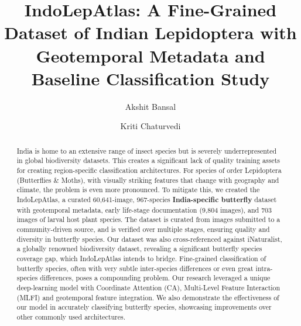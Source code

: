 \documentclass[runningheads]{llncs}
\begin{document}
%
\title{IndoLepAtlas: A Fine-Grained Dataset of Indian Lepidoptera with Geotemporal Metadata and Baseline Classification Study}
%
%
%
\author{
Akshit Bansal \and
Kriti Chaturvedi
}
%
%
\maketitle

\begin{abstract}
India is home to an extensive range of insect species but is severely underrepresented in global biodiversity datasets. This creates a significant lack of quality training assets for creating region-specific classification architectures. For species of order Lepidoptera (Butterflies \& Moths), with visually striking features that change with geography and climate, the problem is even more pronounced. To mitigate this, we created the IndoLepAtlas, a curated 60,641-image, 967-species \textbf{India-specific butterfly} dataset with geotemporal metadata, early life-stage documentation (9,804 images), and 703 images of larval host plant species. The dataset is curated from images submitted to a community-driven source, and is verified over multiple stages, ensuring quality and diversity in butterfly species. Our dataset was also cross-referenced against iNaturalist, a globally renowned biodiversity dataset, revealing a significant butterfly species coverage gap, which IndoLepAtlas intends to bridge. Fine-grained classification of butterfly species, often with very subtle inter-species differences or even great intra-species differences, poses a compounding problem. Our research leveraged a unique deep-learning model with Coordinate Attention (CA), Multi-Level Feature Interaction (MLFI) and geotemporal feature integration. We also demonstrate the effectiveness of our model in accurately classifying butterfly species, showcasing improvements over other commonly used architectures.


\end{abstract}
\end{document}
